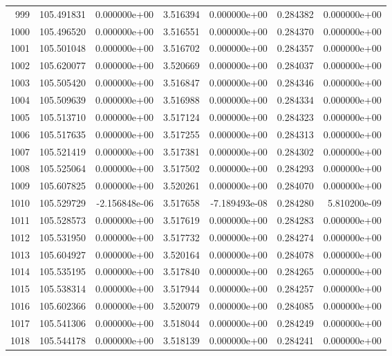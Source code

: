 \begin{tabular}{rrrrrrr}
 999 & 105.491831 &  0.000000e+00 &  3.516394 &  0.000000e+00 &   0.284382 &  0.000000e+00 \\
1000 & 105.496520 &  0.000000e+00 &  3.516551 &  0.000000e+00 &   0.284370 &  0.000000e+00 \\
1001 & 105.501048 &  0.000000e+00 &  3.516702 &  0.000000e+00 &   0.284357 &  0.000000e+00 \\
1002 & 105.620077 &  0.000000e+00 &  3.520669 &  0.000000e+00 &   0.284037 &  0.000000e+00 \\
1003 & 105.505420 &  0.000000e+00 &  3.516847 &  0.000000e+00 &   0.284346 &  0.000000e+00 \\
1004 & 105.509639 &  0.000000e+00 &  3.516988 &  0.000000e+00 &   0.284334 &  0.000000e+00 \\
1005 & 105.513710 &  0.000000e+00 &  3.517124 &  0.000000e+00 &   0.284323 &  0.000000e+00 \\
1006 & 105.517635 &  0.000000e+00 &  3.517255 &  0.000000e+00 &   0.284313 &  0.000000e+00 \\
1007 & 105.521419 &  0.000000e+00 &  3.517381 &  0.000000e+00 &   0.284302 &  0.000000e+00 \\
1008 & 105.525064 &  0.000000e+00 &  3.517502 &  0.000000e+00 &   0.284293 &  0.000000e+00 \\
1009 & 105.607825 &  0.000000e+00 &  3.520261 &  0.000000e+00 &   0.284070 &  0.000000e+00 \\
1010 & 105.529729 & -2.156848e-06 &  3.517658 & -7.189493e-08 &   0.284280 &  5.810200e-09 \\
1011 & 105.528573 &  0.000000e+00 &  3.517619 &  0.000000e+00 &   0.284283 &  0.000000e+00 \\
1012 & 105.531950 &  0.000000e+00 &  3.517732 &  0.000000e+00 &   0.284274 &  0.000000e+00 \\
1013 & 105.604927 &  0.000000e+00 &  3.520164 &  0.000000e+00 &   0.284078 &  0.000000e+00 \\
1014 & 105.535195 &  0.000000e+00 &  3.517840 &  0.000000e+00 &   0.284265 &  0.000000e+00 \\
1015 & 105.538314 &  0.000000e+00 &  3.517944 &  0.000000e+00 &   0.284257 &  0.000000e+00 \\
1016 & 105.602366 &  0.000000e+00 &  3.520079 &  0.000000e+00 &   0.284085 &  0.000000e+00 \\
1017 & 105.541306 &  0.000000e+00 &  3.518044 &  0.000000e+00 &   0.284249 &  0.000000e+00 \\
1018 & 105.544178 &  0.000000e+00 &  3.518139 &  0.000000e+00 &   0.284241 &  0.000000e+00 \\

\end{tabular}
